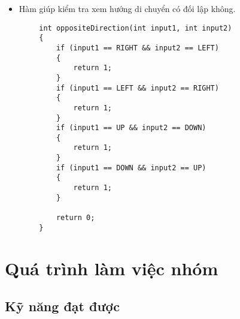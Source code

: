 \documentclass[a4paper, 12pt]{article}
\begin{document}
\begin{center}
    \begin{itemize}
        \item Hàm giúp kiểm tra xem hướng di chuyển có đối lập không.
    \end{itemize}
    
    \begin{lstlisting}
        int oppositeDirection(int input1, int input2)
        {
            if (input1 == RIGHT && input2 == LEFT)
            {
                return 1;
            }
            if (input1 == LEFT && input2 == RIGHT)
            {
                return 1;
            }
            if (input1 == UP && input2 == DOWN)
            {
                return 1;
            }
            if (input1 == DOWN && input2 == UP)
            {
                return 1;
            }
        
            return 0;
        }
    \end{lstlisting}
\end{center}

\section{Quá trình làm việc nhóm}

\subsection{Kỹ năng đạt được}

\end{document}
